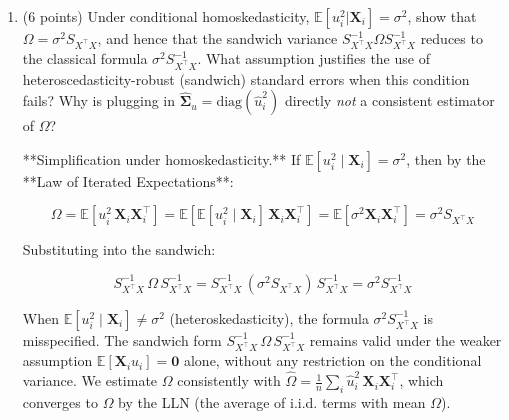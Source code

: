 \documentclass[letterpaper,12pt]{article}
\begin{document}
\begin{enumerate}[label=(\alph*)]
By the CLT (i.i.d., mean zero, finite variance):

$$\frac{1}{\sqrt{n}}\sum_i \mathbf{X}_i u_i \xrightarrow{d} N(\mathbf{0},\, \Omega)$$

**Step 3 — Slutsky's Theorem.** Combining a sequence converging in probability ($S_{X^\top X}^{-1}$) with a sequence converging in distribution ($\frac{1}{\sqrt{n}}\sum \mathbf{X}_i u_i$), **Slutsky's theorem** gives:


$$\boxed{\sqrt{n}\left(\hat{\boldsymbol{\beta}}^{OLS} - \boldsymbol{\beta}\right) \xrightarrow{d} N\!\left(\mathbf{0},\; S_{X^\top X}^{-1}\,\Omega\, S_{X^\top X}^{-1}\right)}$$

\item (6 points) Under conditional homoskedasticity, $\mathbb{E}[u_i^2|\mathbf{X}_i]=\sigma^2$, show that $\Omega = \sigma^2 S_{X^\top X}$, and hence that the sandwich variance $S_{X^\top X}^{-1}\Omega S_{X^\top X}^{-1}$ reduces to the classical formula $\sigma^2 S_{X^\top X}^{-1}$. What assumption justifies the use of heteroscedasticity-robust (sandwich) standard errors when this condition fails? Why is plugging in $\hat{\bm{\Sigma}}_u = \mathrm{diag}(\hat{u}_i^2)$ directly \textit{not} a consistent estimator of $\Omega$?

**Simplification under homoskedasticity.** If $\mathbb{E}[u_i^2 \mid \mathbf{X}_i] = \sigma^2$, then by the **Law of Iterated Expectations**:

$$\Omega = \mathbb{E}[u_i^2\, \mathbf{X}_i\mathbf{X}_i^\top] = \mathbb{E}\!\left[\mathbb{E}[u_i^2 \mid \mathbf{X}_i]\, \mathbf{X}_i\mathbf{X}_i^\top\right] = \mathbb{E}\!\left[\sigma^2 \mathbf{X}_i\mathbf{X}_i^\top\right] = \sigma^2 S_{X^\top X}$$

Substituting into the sandwich:

$$S_{X^\top X}^{-1}\,\Omega\, S_{X^\top X}^{-1} = S_{X^\top X}^{-1}\,(\sigma^2 S_{X^\top X})\, S_{X^\top X}^{-1} = \sigma^2 S_{X^\top X}^{-1}  $$



When $\mathbb{E}[u_i^2 \mid \mathbf{X}_i] \neq \sigma^2$ (heteroskedasticity), the formula $\sigma^2 S_{X^\top X}^{-1}$ is misspecified. The sandwich form $S_{X^\top X}^{-1}\,\Omega\, S_{X^\top X}^{-1}$ remains valid under the weaker assumption $\mathbb{E}[\mathbf{X}_i u_i] = \mathbf{0}$ alone, without any restriction on the conditional variance. We estimate $\Omega$ consistently with $\hat{\Omega} = \frac{1}{n}\sum_i \hat{u}_i^2\, \mathbf{X}_i\mathbf{X}_i^\top$, which converges to $\Omega$ by the LLN (the average of i.i.d. terms with mean $\Omega$). \\


\end{enumerate}
\end{document}
